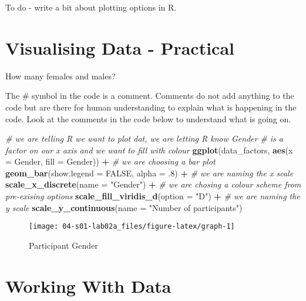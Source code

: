 \documentclass[]{book}
\newenvironment{Shaded}{\begin{snugshade}}{\end{snugshade}}
\newcommand{\CommentTok}[1]{\textcolor[rgb]{0.56,0.35,0.01}{\textit{#1}}}
\newcommand{\DataTypeTok}[1]{\textcolor[rgb]{0.13,0.29,0.53}{#1}}
\newcommand{\FloatTok}[1]{\textcolor[rgb]{0.00,0.00,0.81}{#1}}
\newcommand{\KeywordTok}[1]{\textcolor[rgb]{0.13,0.29,0.53}{\textbf{#1}}}
\newcommand{\NormalTok}[1]{#1}
\newcommand{\OperatorTok}[1]{\textcolor[rgb]{0.81,0.36,0.00}{\textbf{#1}}}
\newcommand{\OtherTok}[1]{\textcolor[rgb]{0.56,0.35,0.01}{#1}}
\newcommand{\StringTok}[1]{\textcolor[rgb]{0.31,0.60,0.02}{#1}}
\begin{document}
To do - write a bit about plotting options in R.

\hypertarget{visualising-data---practical}{%
\section{Visualising Data - Practical}\label{visualising-data---practical}}

How many females and males?

The \# symbol in the code is a comment. Comments do not add anything to the code but are there for human understanding to explain what is happening in the code. Look at the comments in the code below to understand what is going on.

\begin{Shaded}
\begin{Highlighting}[]
\CommentTok{# we are telling R we want to plot dat, we are letting R know Gender }
\CommentTok{# is a factor on our x axis and we want to fill with colour}
\KeywordTok{ggplot}\NormalTok{(data_factors, }\KeywordTok{aes}\NormalTok{(}\DataTypeTok{x =}\NormalTok{ Gender, }\DataTypeTok{fill =}\NormalTok{ Gender)) }\OperatorTok{+}
\StringTok{  }\CommentTok{# we are choosing a bar plot}
\StringTok{  }\KeywordTok{geom_bar}\NormalTok{(}\DataTypeTok{show.legend =} \OtherTok{FALSE}\NormalTok{, }\DataTypeTok{alpha =} \FloatTok{.8}\NormalTok{) }\OperatorTok{+}
\StringTok{  }\CommentTok{# we are naming the x scale}
\StringTok{  }\KeywordTok{scale_x_discrete}\NormalTok{(}\DataTypeTok{name =} \StringTok{"Gender"}\NormalTok{) }\OperatorTok{+}
\StringTok{  }\CommentTok{# we are chosing a colour scheme from pre-exising options}
\StringTok{  }\KeywordTok{scale_fill_viridis_d}\NormalTok{(}\DataTypeTok{option =} \StringTok{"D"}\NormalTok{) }\OperatorTok{+}
\StringTok{  }\CommentTok{# we are naming the y scale}
\StringTok{  }\KeywordTok{scale_y_continuous}\NormalTok{(}\DataTypeTok{name =} \StringTok{"Number of participants"}\NormalTok{)}
\end{Highlighting}
\end{Shaded}

\begin{figure}

{\centering \texttt{[image: 04-s01-lab02a\_files/figure-latex/graph-1]} 

}

\caption{Participant Gender}\label{fig:graph}
\end{figure}

\hypertarget{working-with-data}{%
\section{Working With Data}\label{working-with-data}}
\end{document}
